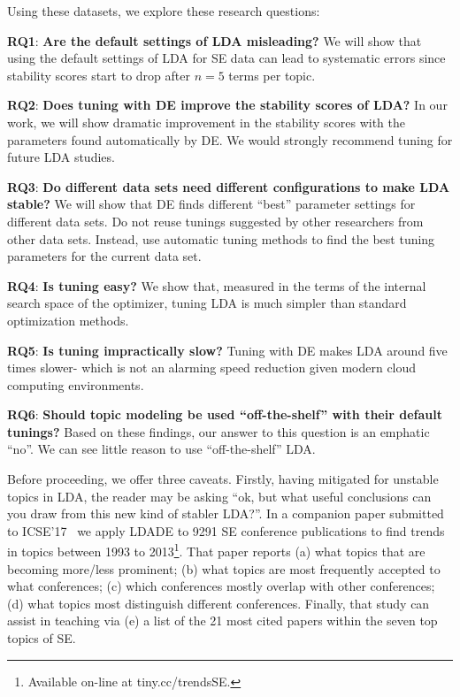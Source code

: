 \documentclass[10pt,conference]{IEEEtran}
\theoremstyle{break}
\begin{document}
\noindent
Using these datasets, we explore these research questions:  
\begin{compactitem}
\item \textbf{RQ1}: \textbf{Are the default settings of LDA misleading?} We will show that using the default settings of LDA for SE data can lead to systematic errors since stability scores start to drop after $n=5$ terms per topic.
    \item \textbf{RQ2}: \textbf{Does tuning with DE improve the stability scores of LDA?} In our work, we will show dramatic improvement in the stability scores with the parameters found automatically by DE. We would strongly recommend tuning for future LDA studies.
    \item \textbf{RQ3}: \textbf{Do different data sets
      need different configurations to make LDA stable?} We will show that DE finds different ``best'' parameter settings for different data sets. Do not reuse  tunings  suggested  by  other  researchers  from other  data  sets.  Instead,  use  automatic  tuning  methods  to find the best tuning parameters for the current data set.
    \item \textbf{RQ4}: \textbf{Is tuning easy?} We show that, measured
      in the terms of the internal search space of the optimizer,
      tuning LDA is much simpler than standard optimization methods.
    \item \textbf{RQ5}: \textbf{Is tuning impractically slow?}
      Tuning with DE makes LDA around five times slower- which is not an alarming
      speed reduction given modern cloud computing environments.
    \item \textbf{RQ6}: \textbf{Should topic modeling be used “off-the-shelf” with their default tunings?}
      Based on these findings, our answer to this question is an emphatic ``no''. We can see little reason to use “off-the-shelf” LDA.
\end{compactitem}
Before proceeding, we offer three caveats.
Firstly, having mitigated for unstable topics in LDA, the reader may be asking ``ok, but what useful
conclusions can you
draw from this new kind of stabler LDA?''. In a companion paper submitted to ICSE'17~\cite{mathews17}
we apply LDADE to 9291 SE conference publications to find trends in topics between
  1993 to 2013\footnote{Available on-line at tiny.cc/trendsSE.}.
That paper reports (a) what topics that are
 becoming more/less prominent; (b) what topics  are most frequently
 accepted to what conferences; (c) which conferences mostly
 overlap with other conferences; (d) what topics most distinguish different
 conferences.  Finally, that study can assist
 in teaching via (e) a list of the 21 most cited papers within the seven top
 topics of SE.
 
\end{document}
